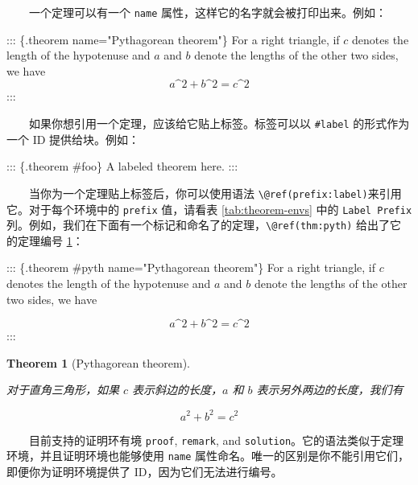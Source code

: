 \documentclass[
  12pt,
]{krantz}
\newenvironment{Shaded}{\begin{snugshade}}{\end{snugshade}}
\newcommand{\NormalTok}[1]{#1}
\newtheorem{theorem}{Theorem}[chapter]
\theoremstyle{definition}
\theoremstyle{definition}
\theoremstyle{definition}
\theoremstyle{definition}
\theoremstyle{remark}
\begin{document}
  一个定理可以有一个 \texttt{name} 属性，这样它的名字就会被打印出来。例如：

\begin{Shaded}
\begin{Highlighting}[]
\NormalTok{::: \{.theorem name="Pythagorean theorem"\}}
\NormalTok{For a right triangle, if $c$ denotes the length of the hypotenuse}
\NormalTok{and $a$ and $b$ denote the lengths of the other two sides, we have}
\NormalTok{$$a\^{}2 + b\^{}2 = c\^{}2$$}
\NormalTok{:::}
\end{Highlighting}
\end{Shaded}

  如果你想引用一个定理，应该给它贴上标签。标签可以以 \texttt{\#label} 的形式作为一个 ID 提供给块。例如：

\begin{Shaded}
\begin{Highlighting}[]
\NormalTok{::: \{.theorem \#foo\}}
\NormalTok{A labeled theorem here.}
\NormalTok{:::}
\end{Highlighting}
\end{Shaded}

  当你为一个定理贴上标签后，你可以使用语法 \texttt{\textbackslash{}@ref(prefix:label)}来引用它。对于每个环境中的 \texttt{prefix} 值，请看表 \ref{tab:theorem-envs} 中的 \texttt{Label\ Prefix} 列。例如，我们在下面有一个标记和命名了的定理，\texttt{\textbackslash{}@ref(thm:pyth)} 给出了它的定理编号 \ref{thm:pyth}：

\begin{Shaded}
\begin{Highlighting}[]
\NormalTok{::: \{.theorem \#pyth name="Pythagorean theorem"\}}
\NormalTok{For a right triangle, if $c$ denotes the length of the hypotenuse}
\NormalTok{and $a$ and $b$ denote the lengths of the other two sides, we have}

\NormalTok{$$a\^{}2 + b\^{}2 = c\^{}2$$}
\NormalTok{:::}
\end{Highlighting}
\end{Shaded}

\begin{theorem}[Pythagorean theorem]
\protect\hypertarget{thm:pyth}{}\label{thm:pyth}

对于直角三角形，如果 \(c\) 表示斜边的长度，\(a\) 和 \(b\) 表示另外两边的长度，我们有

\[a^2 + b^2 = c^2\]

\end{theorem}

  目前支持的证明环有境 \texttt{proof}, \texttt{remark}, and \texttt{solution}。它的语法类似于定理环境，并且证明环境也能够使用 \texttt{name} 属性命名。唯一的区别是你不能引用它们，即便你为证明环境提供了 ID，因为它们无法进行编号。
\end{document}
